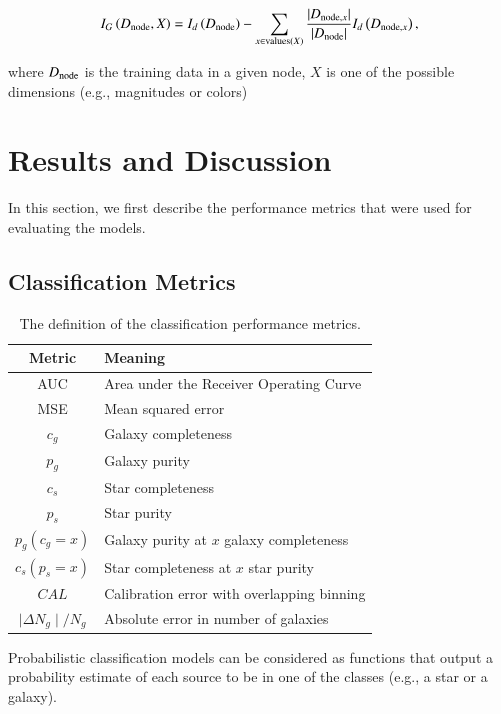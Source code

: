 \documentclass[fleqn,usenatbib]{mnras}
\newcommand{\eg}{{e.g., }}
\begin{document}
\begin{equation} \label{eq:information_gain}
  I_G \left(D_{{\mathrm{node}}}, X\right)
  = I_d \left( D_{{\mathrm{node}}} \right)
  - \sum_{x \in {\mathrm{values}}(X)}
  \frac{|D_{{\mathrm{node}}, x}|}{|D_{{\mathrm{node}}}|}
  I_d \left( D_{{\mathrm{node}}, x} \right),
\end{equation}

\noindent
where $D_{{\mathrm{node}}}$ is the training data in a given node,
$X$ is one of the possible dimensions (\eg magnitudes or colors)



\section{Results and Discussion}
  \label{sec:results_and_discussion}

In this section, we first describe the performance metrics that were used for
evaluating the models.

\subsection{Classification Metrics}

\begin{table}
  \caption{The definition of the classification performance metrics.}
  \centering
  \begin{tabular}{c l}
  \hline
  Metric & Meaning \\
  \hline
  AUC & Area under the Receiver Operating Curve \\
  MSE & Mean squared error \\
  $c_g$ & Galaxy completeness \\
  $p_g$ & Galaxy purity \\
  $c_s$ & Star completeness \\
  $p_s$ & Star purity \\
  $p_g(c_g=x)$ & Galaxy purity at $x$ galaxy completeness \\
  $c_s(p_s=x)$ & Star completeness at $x$ star purity \\
  $CAL$ & Calibration error with overlapping binning \\
  $\mid\Delta N_g\mid / N_g$ & Absolute error in number of galaxies\\
  \hline
  \end{tabular}
  \label{table:metrics}
\end{table}

Probabilistic classification models can be considered as
functions that output a probability estimate of each source
to be in one of the classes (\eg a star or a galaxy).
\end{document}
